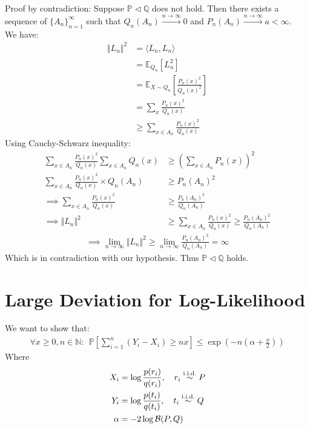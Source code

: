\documentclass{article}
\numberwithin{equation}{section}
\newcommand{\EX}[2][]{\mathbb{E}_{#1}\left[#2\right]}%
\newcommand{\prob}[1]{\mathbb{P}\left[#1\right]}%
\newcommand{\norm}[2][]{\Vert #2\Vert_{#1}}
\begin{document}
\subsection{}
Proof by contradiction: Suppose \(\mathbb{P} \triangleleft \mathbb{Q}\) does not hold. Then there exists a sequence of \(\{A_n\}_{n=1}^\infty\) such that \(Q_n(A_n) \xrightarrow{n \to \infty} 0\) and \(P_n(A_n) \xrightarrow{n \to \infty} a < \infty\).\\
We have:
\begin{align}
\norm{L_n}^2 &= \langle L_n, L_n \rangle\\
&= \EX[Q_n]{L_n^2}\\
&= \EX[X\sim Q_n]{\frac{P_n(x)^2}{Q_n(x)^2}}\\
&= \sum_x \frac{P_n(x)^2}{Q_n(x)}\\
&\ge \sum_{x\in A_n} \frac{P_n(x)^2}{Q_n(x)}
\end{align}
Using Cauchy-Schwarz inequality:
\begin{align}
\sum_{x\in A_n} \frac{P_n(x)^2}{Q_n(x)} \sum_{x\in A_n} Q_n(x) &\ge \left(\sum_{x\in A_n} P_n(x)\right)^2\\
\sum_{x\in A_n} \frac{P_n(x)^2}{Q_n(x)} \times Q_n(A_n) &\ge P_n(A_n)^2\\
\implies \sum_{x\in A_n} \frac{P_n(x)^2}{Q_n(x)} &\ge \frac{P_n(A_n)^2}{Q_n(A_n)}\\
\implies \norm{L_n}^2 &\ge \sum_{x\in A_n} \frac{P_n(x)^2}{Q_n(x)} \ge \frac{P_n(A_n)^2}{Q_n(A_n)}
\end{align}
\begin{align}
\implies \lim_{n\to\infty} \norm{L_n}^2 \ge \lim_{n\to\infty} \frac{P_n(A_n)^2}{Q_n(A_n)} = \infty
\end{align}
Which is in contradiction with our hypothesis. Thus \(\mathbb{P} \triangleleft \mathbb{Q}\) holds.

\section{Large Deviation for Log-Likelihood}
We want to show that:
\begin{align}
\forall x \ge 0, n \in \mathbb{N}:\ \ \prob{\sum_{i=1}^n (Y_i - X_i)\ge nx} \le \exp(-n(\alpha + \frac{x}{2}))
\end{align}
Where 
\begin{align*}
X_i &= \log \frac{p(r_i)}{q(r_i)}, \quad r_i \stackrel{\textup{i.i.d.}}{\sim} P\\
Y_i &= \log \frac{p(t_i)}{q(t_i)}, \quad t_i \stackrel{\textup{i.i.d.}}{\sim} Q\\
\alpha &= -2\log \mathcal{B}(P, Q)
\end{align*}
\end{document}
